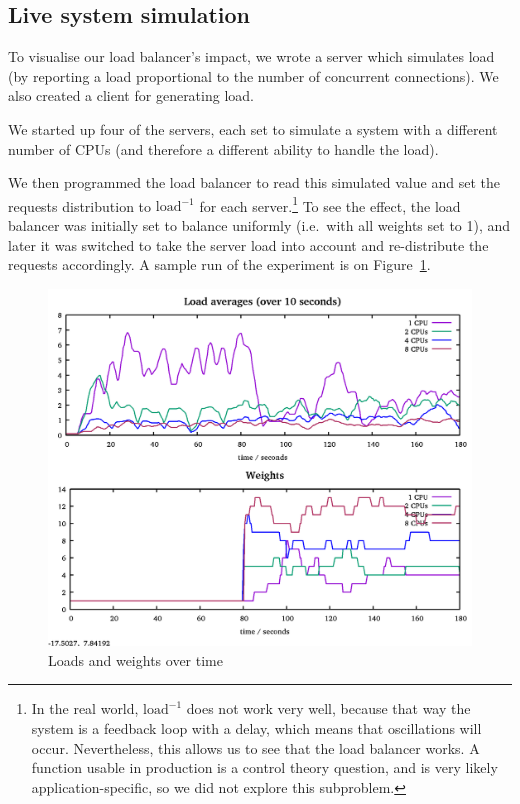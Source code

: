 \documentclass[11pt,oneside,a4paper]{article}
\begin{document}
\subsection{Live system simulation}
To visualise our load balancer's impact, we wrote a server which simulates load
(by reporting a load proportional to the number of concurrent connections).
We also created a client for generating load.

We started up four of the servers, each set to simulate a system with a
different number of CPUs (and therefore a different ability to handle the load).

We then programmed the load balancer to read this simulated value and set the
requests distribution to $\mathrm{load}^{-1}$ for each server.\footnote{%
In the real world, $\mathrm{load}^{-1}$ does not work very well, because that way
the system is a feedback loop with a delay, which means that oscillations will
occur.
Nevertheless, this allows us to see that the load balancer works.
A function usable in production is a control theory question, and is very likely
application-specific, so we did not explore this subproblem.
}
To see the effect, the load balancer was initially set to balance uniformly
(i.e.~with all weights set to 1), and later it was switched to take the server
load into account and re-distribute the requests accordingly.
A sample run of the experiment is on Figure~\ref{fig:demo1-wide}.

\begin{figure}[h]
\centering
\includegraphics[width=.8\textwidth]{figures/demo1-wide.png}
\caption{Loads and weights over time}
\label{fig:demo1-wide}
\end{figure}
\end{document}
